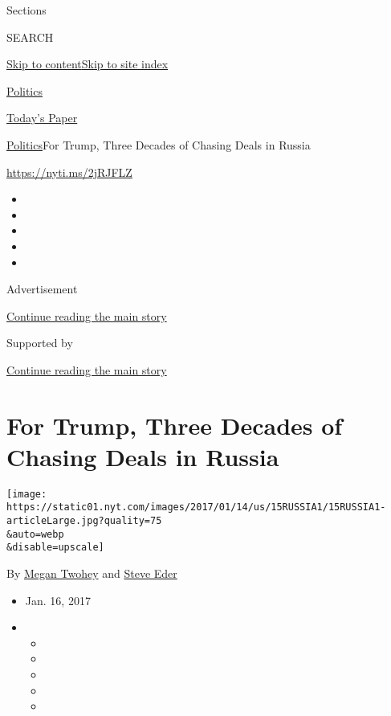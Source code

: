 Sections

SEARCH

\protect\hyperlink{site-content}{Skip to
content}\protect\hyperlink{site-index}{Skip to site index}

\href{https://www.nytimes.com/section/politics}{Politics}

\href{https://myaccount.nytimes.com/auth/login?response_type=cookie\&client_id=vi}{}

\href{https://www.nytimes.com/section/todayspaper}{Today's Paper}

\href{/section/politics}{Politics}\textbar{}For Trump, Three Decades of
Chasing Deals in Russia

\url{https://nyti.ms/2jRJFLZ}

\begin{itemize}
\item
\item
\item
\item
\item
\end{itemize}

Advertisement

\protect\hyperlink{after-top}{Continue reading the main story}

Supported by

\protect\hyperlink{after-sponsor}{Continue reading the main story}

\hypertarget{for-trump-three-decades-of-chasing-deals-in-russia}{%
\section{For Trump, Three Decades of Chasing Deals in
Russia}\label{for-trump-three-decades-of-chasing-deals-in-russia}}

\texttt{[image: https://static01.nyt.com/images/2017/01/14/us/15RUSSIA1/15RUSSIA1-articleLarge.jpg?quality=75\\\&auto=webp\\\&disable=upscale]}

By \href{https://www.nytimes.com/by/megan-twohey}{Megan Twohey} and
\href{http://www.nytimes.com/by/steve-eder}{Steve Eder}

\begin{itemize}
\item
  Jan. 16, 2017
\item
  \begin{itemize}
  \item
  \item
  \item
  \item
  \item
  \end{itemize}
\end{itemize}

